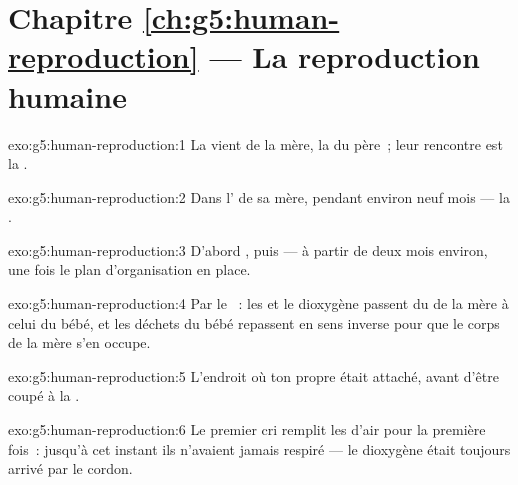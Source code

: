 \section*{Chapitre \ref{ch:g5:human-reproduction} --- La reproduction humaine}

\begin{solution}{exo:g5:human-reproduction:1}
La  vient de la mère, la  du père~; leur
rencontre est la .
\end{solution}

\begin{solution}{exo:g5:human-reproduction:2}
Dans l' de sa mère, pendant environ neuf mois --- la
.
\end{solution}

\begin{solution}{exo:g5:human-reproduction:3}
D'abord , puis  --- à partir de deux mois environ, une
fois le plan d'organisation en place.
\end{solution}

\begin{solution}{exo:g5:human-reproduction:4}
Par le ~: les  et le dioxygène passent du
 de la mère à celui du bébé, et les déchets du bébé repassent en
sens inverse pour que le corps de la mère s'en occupe.
\end{solution}

\begin{solution}{exo:g5:human-reproduction:5}
L'endroit où ton propre  était attaché, avant d'être
coupé à la .
\end{solution}

\begin{solution}{exo:g5:human-reproduction:6}
Le premier cri remplit les  d'air pour la première fois~:
jusqu'à cet instant ils n'avaient jamais respiré --- le dioxygène
était toujours arrivé par le cordon.
\end{solution}

